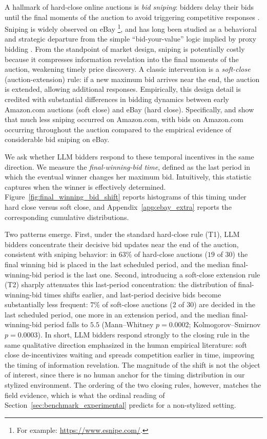 \documentclass{article} %
\newif\ifmarkrev
\newcommand{\rev}[1]{\ifmarkrev\begingroup\color{red}#1\endgroup\else#1\fi}
\begin{document}
A hallmark of hard-close online auctions is \emph{bid sniping}: bidders delay their bids until the final moments of the auction to avoid triggering competitive responses . Sniping is widely observed on eBay \footnote{For example: \url{https://www.esnipe.com/}.}, and has long been studied as a behavioral and strategic departure from the simple ``bid-your-value'' logic implied by proxy bidding \citep{roth2002last}.
From the standpoint of market design, sniping is potentially costly because it compresses information revelation into the final moments of the auction, weakening timely price discovery.
A classic intervention is a \emph{soft-close} (auction-extension) rule: if a new maximum bid arrives near the end, the auction is extended, allowing additional responses. Empirically, this design detail is credited with substantial differences in bidding dynamics between early Amazon.com auctions (soft close) and eBay (hard close).
Specifically, \citet{roth2002last} and \citet{ockenfels2006late} show that much less sniping occurred on Amazon.com, with bids on Amazon.com occurring throughout the auction compared to the empirical evidence of considerable bid
sniping on eBay.


We ask whether LLM bidders respond to these temporal incentives in the same direction. We measure the \emph{final-winning-bid time}, defined as the last period in which the eventual winner changes her maximum bid. Intuitively, this statistic captures when the winner is effectively determined. Figure~\ref{fig:final_winning_bid_shift} reports histograms of this timing under hard close versus soft close, \rev{and Appendix~\ref{app:ebay_extra} reports the corresponding cumulative distributions}.

Two patterns emerge. First, under the standard hard-close rule (T1), LLM bidders concentrate their decisive bid updates near the end of the auction, consistent with sniping behavior\rev{: in $63\%$ of hard-close auctions ($19$ of $30$) the final winning bid is placed in the last scheduled period, and the median final-winning-bid period is the last one}. Second, introducing a soft-close extension rule (T2) sharply attenuates this last-period concentration: the distribution of final-winning-bid times shifts earlier, and last-period decisive bids become substantially less frequent\rev{: $7\%$ of soft-close auctions ($2$ of $30$) are decided in the last scheduled period, one more in an extension period, and the median final-winning-bid period falls to $5.5$ (Mann--Whitney $p=0.0002$; Kolmogorov--Smirnov $p=0.0003$)}. In short, LLM bidders respond strongly to the closing rule in the same qualitative direction emphasized in the human empirical literature: soft close de-incentivizes waiting and spreads competition earlier in time, improving the timing of information revelation. \rev{The magnitude of the shift is not the object of interest, since there is no human anchor for the timing distribution in our stylized environment. The ordering of the two closing rules, however, matches the field evidence, which is what the ordinal reading of Section~\ref{sec:benchmark_experimental} predicts for a non-stylized setting.}
\end{document}

